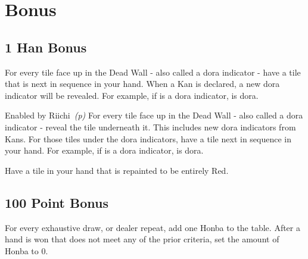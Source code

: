 \section{Bonus}\label{core:sec:bonus}

\subsection{1 Han Bonus}\label{core:ssec:1-han-bonus}

	{}
	{For every tile face up in the Dead Wall - also called a dora indicator - have a tile that is next in sequence in your hand. When a Kan is declared, a new dora indicator will be revealed. For example, if  is a dora indicator,  is dora.}

	{\upgradesfromother Enabled by Riichi~\textit{(p\pageref{core:yaku:Riichi})}}
	{For every tile face up in the Dead Wall - also called a dora indicator - reveal the tile underneath it. This includes new dora indicators from Kans. For those tiles under the dora indicators, have a tile next in sequence in your hand. For example, if  is a dora indicator,  is dora.}

	{}
	{Have a tile in your hand that is repainted to be entirely Red.}

\subsection{100 Point Bonus}\label{core:ssec:100-point-bonus}

	{}
	{For every exhaustive draw, or dealer repeat, add one Honba to the table. After a hand is won that does not meet any of the prior criteria, set the amount of Honba to 0.}